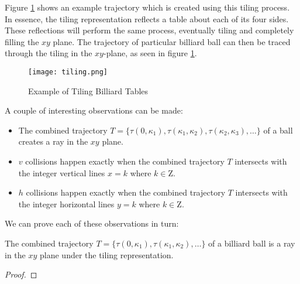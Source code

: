Figure \ref{fig:tiling} shows an example trajectory which is created using this tiling process. In essence, the tiling representation reflects a table about each of its four sides. These reflections will perform the same process, eventually tiling and completely filling the $xy$ plane. The trajectory of particular billiard ball can then be traced through the tiling in the $xy$-plane, as seen in figure \ref{fig:tiling}.

\begin{figure}
  \texttt{[image: tiling.png]}
  \caption{\label{fig:tiling}Example of Tiling Billiard Tables}
\end{figure}

A couple of interesting observations can be made:

\begin{itemize}
  \item The combined trajectory $T = \{\tau(0, \kappa_1), \tau(\kappa_1, \kappa_2), \tau(\kappa_2, \kappa_3), \ldots \}$ of a ball creates a ray in the $xy$ plane.
  \item $v$ collisions happen exactly when the combined trajectory $T$ intersects with the integer vertical lines $x = k$ where $k \in \mathrm{Z}$.
  \item $h$ collisions happen exactly when the combined trajectory $T$ intersects with the integer horizontal lines $y = k$ where $k \in \mathrm{Z}$.
\end{itemize}

We can prove each of these observations in turn:

\begin{theorem}
  The combined trajectory $T = \{\tau(0, \kappa_1), \tau(\kappa_1, \kappa_2), \ldots\}$ of a billiard ball is a ray in the $xy$ plane under the tiling representation.
  \label{theorem:straight-line}
\end{theorem}
\begin{proof}
\end{proof}

